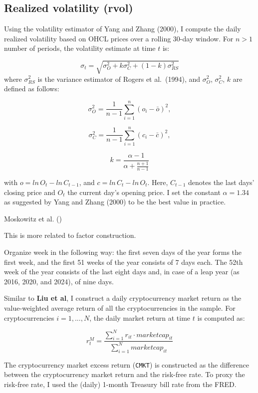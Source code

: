 \documentclass[
  12pt,
  a4paper,
  openany]{scrbook}
\begin{document}
\subsection{Realized volatility (rvol)}\label{realized-volatility-rvol}

Using the volatility estimator of Yang and Zhang (2000), I compute the
daily realized volatility based on OHCL prices over a rolling 30-day
window. For \(n > 1\) number of periods, the volatility estimate at time
\(t\) is:

\[
\sigma_t = \sqrt{\sigma^2_O + k\sigma^2_C + (1 - k)\sigma^2_{RS}}
\] where \(\sigma^2_{RS}\) is the variance estimator of Rogers et
al.~(1994), and \(\sigma^2_O\), \(\sigma^2_C\), \(k\) are defined as
follows:

\[
\sigma^2_O = \frac{1}{n-1}\sum\limits_{i=1}^n(o_i - \bar o)^2,
\]

\[
\sigma^2_C = \frac{1}{n-1}\sum\limits_{i=1}^n(c_i - \bar c)^2,
\]

\[
k = \frac{\alpha -1}{\alpha + \frac{n+1}{n-1}}
\]

with \(o = ln\,O_t - ln\,C_{t-1}\), and \(c = ln\,C_t - ln\,O_t\). Here,
\(C_{t-1}\) denotes the last days' closing price and \(O_t\) the current
day's opening price. I set the constant \(\alpha = 1.34\) as suggested
by Yang and Zhang (2000) to be the best value in practice.

Moskowitz et al. ()

This is more related to factor construction.

Organize week in the following way: the first seven days of the year
forms the first week, and the first 51 weeks of the year consists of 7
days each. The 52th week of the year consists of the last eight days
and, in case of a leap year (as 2016, 2020, and 2024), of nine days.

Similar to \textbf{Liu et al}, I construct a daily cryptocurrency market
return as the value-weighted average return of all the cryptocurrencies
in the sample. For cryptocurrencies \(i = 1, ..., N\), the daily market
return at time \(t\) is computed as:

\[
r_t^M = \frac{\sum_{i=1}^N r_{it} \cdot marketcap_{it}}
             {\sum_{i=1}^N marketcap_{it} }
\]

The cryptocurrency market excess return (\texttt{CMKT}) is constructed
as the difference between the cryptocurrency market return and the
risk-free rate. To proxy the risk-free rate, I used the (daily) 1-month
Treasury bill rate from the FRED.
\end{document}
